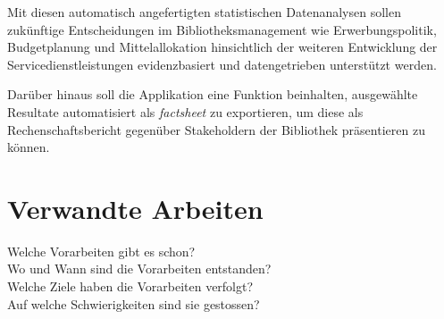 Mit diesen automatisch angefertigten statistischen Datenanalysen sollen zukünftige
Entscheidungen im Bibliotheksmanagement wie Erwerbungspolitik, Budgetplanung und
Mittelallokation hinsichtlich der weiteren Entwicklung der
Servicedienstleistungen evidenzbasiert und datengetrieben unterstützt werden.

Darüber hinaus soll die Applikation  eine Funktion beinhalten, ausgewählte
Resultate automatisiert als \textit{factsheet} zu exportieren, um diese
als Rechenschaftsbericht gegenüber Stakeholdern der Bibliothek präsentieren zu können.

\section{Verwandte Arbeiten}

Welche Vorarbeiten gibt es schon?\\
Wo und Wann sind die Vorarbeiten entstanden?\\
Welche Ziele haben die Vorarbeiten verfolgt?\\
Auf welche Schwierigkeiten sind sie gestossen?

\clearpage


